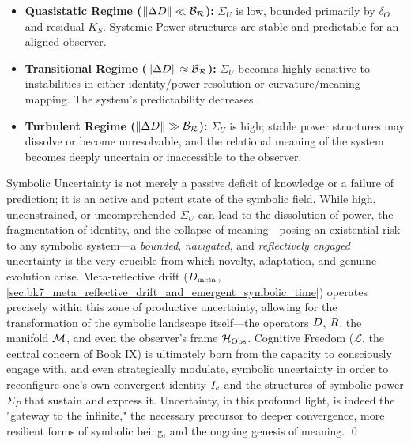 \begin{itemize}
    \item \textbf{Quasistatic Regime (\(\|\Delta D\| \ll \mathcal{B_R}\)):} \(\Sigma_U\) is low, bounded primarily by \(\delta_O\) and residual \(K_S\). Systemic Power structures are stable and predictable for an aligned observer.
    \item \textbf{Transitional Regime (\(\|\Delta D\| \approx \mathcal{B_R}\)):} \(\Sigma_U\) becomes highly sensitive to instabilities in either identity/power resolution or curvature/meaning mapping. The system's predictability decreases.
    \item \textbf{Turbulent Regime (\(\|\Delta D\| \gg \mathcal{B_R}\)):} \(\Sigma_U\) is high; stable power structures may dissolve or become unresolvable, and the relational meaning of the system becomes deeply uncertain or inaccessible to the observer.
\end{itemize}

\begin{scholium}
\label{scholium:bk7_uncertainty_generative_existential}
Symbolic Uncertainty is not merely a passive deficit of knowledge or a failure of prediction; it is an active and potent state of the symbolic field. While high, unconstrained, or uncomprehended \(\Sigma_U\) can lead to the dissolution of power, the fragmentation of identity, and the collapse of meaning—posing an existential risk to any symbolic system—a \emph{bounded}, \emph{navigated}, and \emph{reflectively engaged} uncertainty is the very crucible from which novelty, adaptation, and genuine evolution arise. Meta-reflective drift (\(D_{\text{meta}}\), \ref{sec:bk7_meta_reflective_drift_and_emergent_symbolic_time}) operates precisely within this zone of productive uncertainty, allowing for the transformation of the symbolic landscape itself—the operators \(D\), \(R\), the manifold \(\mathcal{M}\), and even the observer's frame \(\mathcal{H}_{\mathrm{Obs}}\). Cognitive Freedom (\(\mathcal{L}\), the central concern of Book IX) is ultimately born from the capacity to consciously engage with, and even strategically modulate, symbolic uncertainty in order to reconfigure one's own convergent identity \(I_c\) and the structures of symbolic power \(\Sigma_P\) that sustain and express it. Uncertainty, in this profound light, is indeed the "gateway to the infinite," the necessary precursor to deeper convergence, more resilient forms of symbolic being, and the ongoing genesis of meaning. \qed {}
\end{scholium}
